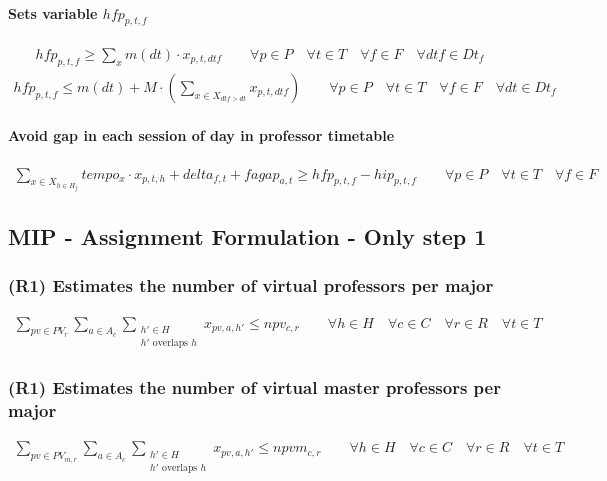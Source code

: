 \paragraph{Sets variable $hfp_{p,t,f}$}
\begin{eqnarray}
hfp_{p,t,f} \geq \sum\limits_{x} m(dt) \cdot x_{p,t,dtf} \nonumber \qquad
\forall p \in P \quad
\forall t \in T \quad
\forall f \in F \quad
\forall dtf \in Dt_{f}
\end{eqnarray}
\begin{eqnarray}
hfp_{p,t,f} \leq m(dt) + M \cdot ( \sum\limits_{x \in X_{dtf>dt}} x_{p,t,dtf} ) \nonumber \qquad
\forall p \in P \quad
\forall t \in T \quad
\forall f \in F \quad
\forall dt \in Dt_{f}
\end{eqnarray}

\paragraph{Avoid gap in each session of day in professor timetable}
\begin{eqnarray}
\sum\limits_{x \in X_{h \in H_{f}}} tempo_{x} \cdot x_{p,t,h} + delta_{f,t} + fagap_{a,t} \geq hfp_{p,t,f} - hip_{p,t,f} \nonumber \qquad
\forall p \in P \quad
\forall t \in T \quad
\forall f \in F
\end{eqnarray}


\subsection{MIP - Assignment Formulation - Only step 1}

\subsubsection{(R1) Estimates the number of virtual professors per major}
\begin{eqnarray}
\sum\limits_{pv \in PV_{r}}\sum\limits_{a \in A_{c}}\sum\limits_{\substack {h' \in H \\ h'\mbox{ overlaps }h}} x_{pv,a,h'} \le npv_{c,r} \nonumber \qquad 
\forall h \in H \quad
\forall c \in C \quad
\forall r \in R \quad
\forall t \in T
\end{eqnarray}

\subsubsection{(R1) Estimates the number of virtual master professors per major}
\begin{eqnarray}
\sum\limits_{pv \in PV_{m,r}}\sum\limits_{a \in A_{c}}\sum\limits_{\substack {h' \in H \\ h'\mbox{ overlaps }h}} x_{pv,a,h'} \le npvm_{c,r} \nonumber \qquad 
\forall h \in H \quad
\forall c \in C \quad
\forall r \in R \quad
\forall t \in T
\end{eqnarray}

